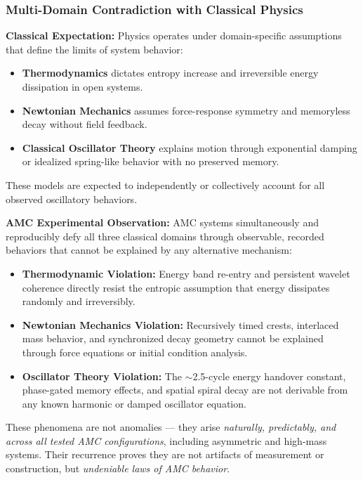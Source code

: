 \documentclass[10pt,aps,pre,onecolumn,superscriptaddress,notitlepage]{revtex4-2}
\begin{document}
\subsubsection{Multi-Domain Contradiction with Classical Physics}
\label{sec:dev11Multi-Domain}


\textbf{Classical Expectation:}  
Physics operates under domain-specific assumptions that define the limits of system behavior:
\begin{itemize}
    \item \textbf{Thermodynamics} dictates entropy increase and irreversible energy dissipation in open systems.
    \item \textbf{Newtonian Mechanics} assumes force-response symmetry and memoryless decay without field feedback.
    \item \textbf{Classical Oscillator Theory} explains motion through exponential damping or idealized spring-like behavior with no preserved memory.
\end{itemize}

These models are expected to independently or collectively account for all observed oscillatory behaviors.

\textbf{AMC Experimental Observation:}  
AMC systems simultaneously and reproducibly defy all three classical domains through observable, recorded behaviors that cannot be explained by any alternative mechanism:
\begin{itemize}
    \item \textbf{Thermodynamic Violation:} Energy band re-entry and persistent wavelet coherence directly resist the entropic assumption that energy dissipates randomly and irreversibly.
    \item \textbf{Newtonian Mechanics Violation:} Recursively timed crests, interlaced mass behavior, and synchronized decay geometry cannot be explained through force equations or initial condition analysis.
    \item \textbf{Oscillator Theory Violation:} The $\sim$2.5-cycle energy handover constant, phase-gated memory effects, and spatial spiral decay are not derivable from any known harmonic or damped oscillator equation.
\end{itemize}

These phenomena are not anomalies — they arise \textit{naturally, predictably, and across all tested AMC configurations}, including asymmetric and high-mass systems. Their recurrence proves they are not artifacts of measurement or construction, but \textit{undeniable laws of AMC behavior}.
\end{document}
